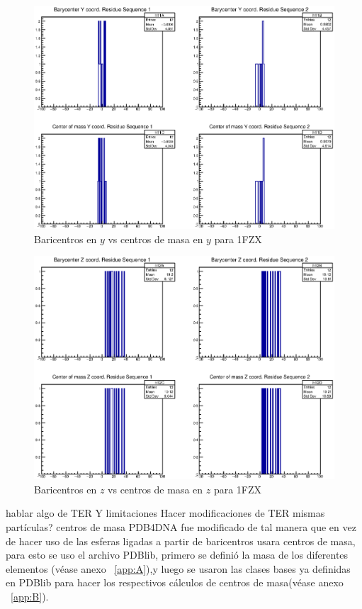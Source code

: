\begin{figure}[htbp]
    \centering
    \includegraphics[width=1\linewidth]{./Figures/1fzy.eps}
  \caption[Baricentros en $y$ vs centros de masa en $y$ para 1FZX]{Baricentros en $y$ vs centros de masa en $y$ para 1FZX}
    \label{fig:cay}
\end{figure}

\begin{figure}[htbp]
    \centering
    \includegraphics[width=1\linewidth]{./Figures/1fzz.eps}
  \caption[Baricentros en $z$ vs centros de masa en $z$ para 1FZX]{Baricentros en $z$ vs centros de masa en $z$ para 1FZX}
    \label{fig:caz}
\end{figure}



hablar algo de TER Y limitaciones
Hacer modificaciones de TER
mismas partículas?
centros de masa
PDB4DNA fue modificado de tal manera que en vez de hacer uso de las esferas ligadas a partir de baricentros usara centros de masa, para esto se uso el archivo PDBlib, primero se definió la masa de los diferentes elementos (véase anexo ~\ref{app:A}),y luego se usaron las clases bases ya definidas en PDBlib para hacer los respectivos cálculos de centros de masa(véase anexo ~\ref{app:B}).\\

